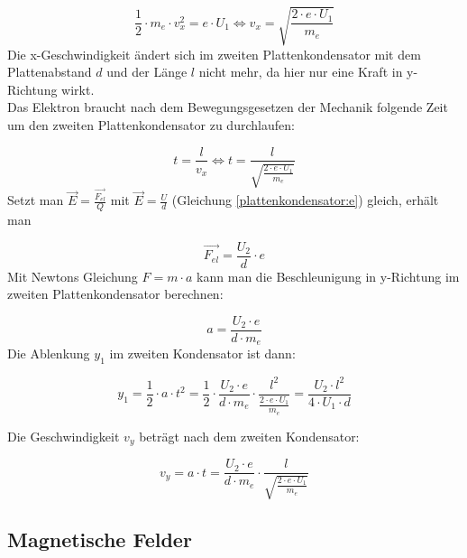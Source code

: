 \documentclass[a4paper]{article}
\begin{document}
					\begin{equation}
						\frac{1}{2}\cdot m_e \cdot v_x^2 = e \cdot U_1 \Leftrightarrow v_x = \sqrt{\frac{2\cdot e\cdot U_1}{m_e}}
					\end{equation}
					Die x-Geschwindigkeit ändert sich im zweiten Plattenkondensator mit dem Plattenabstand $d$ und der Länge $l$ nicht mehr, da hier nur eine Kraft in y-Richtung wirkt.\\
					Das Elektron braucht nach dem Bewegungsgesetzen der Mechanik folgende Zeit um den zweiten Plattenkondensator zu durchlaufen:
					
					\begin{equation}
						t=\frac{l}{v_x}\Leftrightarrow t=\frac{l}{\sqrt{\frac{2\cdot e\cdot U_1}{m_e}}}
					\end{equation}
					Setzt man  $\vec{E}=\frac{\vec{F_{el}}}{Q}$ mit $\vec{E}=\frac{U}{d}$ (Gleichung \ref{plattenkondensator:e}) gleich, erhält man
					
					\begin{equation}
						\vec{F_{el}} = \frac{U_2}{d}\cdot e
					\end{equation}
					Mit Newtons Gleichung $F=m\cdot a$ kann man die Beschleunigung in y-Richtung im zweiten Plattenkondensator berechnen:
					
					\begin{equation}
						a = \frac{U_2\cdot e}{d\cdot m_e}
					\end{equation}
					Die Ablenkung $y_1$ im zweiten Kondensator ist dann:
					
					\begin{equation}
						y_1 = \frac{1}{2}\cdot a \cdot t^2 = \frac{1}{2}\cdot \frac{U_2\cdot e}{d\cdot m_e} \cdot \frac{l^2}{\frac{2\cdot e\cdot U_1}{m_e}}=\frac{U_2\cdot l^2}{4\cdot U_1\cdot d}
					\end{equation}
					
					Die Geschwindigkeit $v_y$ beträgt nach dem zweiten Kondensator:
					
					\begin{equation}
						v_y = a\cdot t = \frac{U_2\cdot e}{d\cdot m_e} \cdot \frac{l}{\sqrt{\frac{2\cdot e\cdot U_1}{m_e}}}
					\end{equation}
					
					
	
		\subsection{Magnetische Felder}
		
\end{document}
